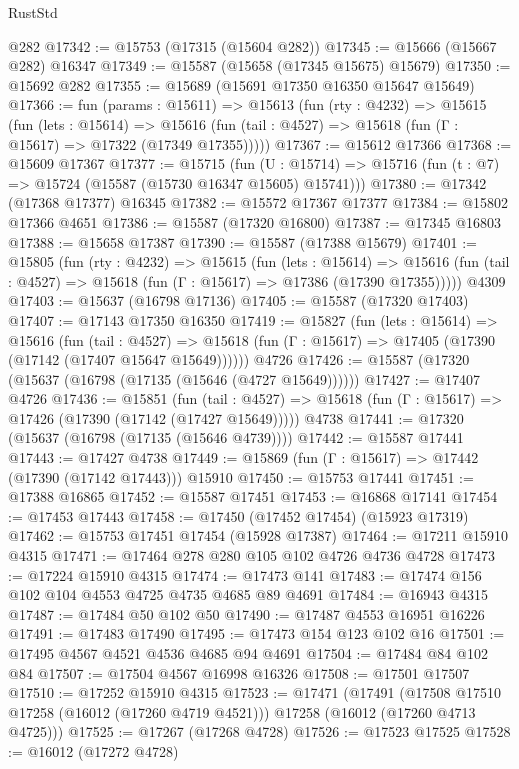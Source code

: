 \begin{lexlean}{RustStd}
\begin{coremodule}
    @282
@17342 := @15753 (@17315 (@15604 @282))
@17345 := @15666 (@15667 @282) @16347
@17349 := @15587 (@15658 (@17345 @15675) @15679)
@17350 := @15692 @282
@17355 := @15689 (@15691 @17350 @16350 @15647 @15649)
@17366 := fun (params : @15611) =>
  @15613
    (fun (rty : @4232) =>
    @15615
      (fun (lets : @15614) =>
      @15616 (fun (tail : @4527) => @15618 (fun (Γ : @15617) => @17322 (@17349 @17355)))))
@17367 := @15612 @17366
@17368 := @15609 @17367
@17377 := @15715
    (fun (U : @15714) => @15716 (fun (t : @7) => @15724 (@15587 (@15730 @16347 @15605) @15741)))
@17380 := @17342 (@17368 @17377) @16345
@17382 := @15572 @17367 @17377
@17384 := @15802 @17366 @4651
@17386 := @15587 (@17320 @16800)
@17387 := @17345 @16803
@17388 := @15658 @17387
@17390 := @15587 (@17388 @15679)
@17401 := @15805
    (fun (rty : @4232) =>
    @15615
      (fun (lets : @15614) =>
      @15616 (fun (tail : @4527) => @15618 (fun (Γ : @15617) => @17386 (@17390 @17355)))))
    @4309
@17403 := @15637 (@16798 @17136)
@17405 := @15587 (@17320 @17403)
@17407 := @17143 @17350 @16350
@17419 := @15827
    (fun (lets : @15614) =>
    @15616
      (fun (tail : @4527) =>
      @15618 (fun (Γ : @15617) => @17405 (@17390 (@17142 (@17407 @15647 @15649))))))
    @4726
@17426 := @15587 (@17320 (@15637 (@16798 (@17135 (@15646 (@4727 @15649))))))
@17427 := @17407 @4726
@17436 := @15851
    (fun (tail : @4527) => @15618 (fun (Γ : @15617) => @17426 (@17390 (@17142 (@17427 @15649)))))
    @4738
@17441 := @17320 (@15637 (@16798 (@17135 (@15646 @4739))))
@17442 := @15587 @17441
@17443 := @17427 @4738
@17449 := @15869 (fun (Γ : @15617) => @17442 (@17390 (@17142 @17443))) @15910
@17450 := @15753 @17441
@17451 := @17388 @16865
@17452 := @15587 @17451
@17453 := @16868 @17141
@17454 := @17453 @17443
@17458 := @17450 (@17452 @17454) (@15923 @17319)
@17462 := @15753 @17451 @17454 (@15928 @17387)
@17464 := @17211 @15910 @4315
@17471 := @17464 @278 @280 @105 @102 @4726 @4736 @4728
@17473 := @17224 @15910 @4315
@17474 := @17473 @141
@17483 := @17474 @156 @102 @104 @4553 @4725 @4735 @4685 @89 @4691
@17484 := @16943 @4315
@17487 := @17484 @50 @102 @50
@17490 := @17487 @4553 @16951 @16226
@17491 := @17483 @17490
@17495 := @17473 @154 @123 @102 @16
@17501 := @17495 @4567 @4521 @4536 @4685 @94 @4691
@17504 := @17484 @84 @102 @84
@17507 := @17504 @4567 @16998 @16326
@17508 := @17501 @17507
@17510 := @17252 @15910 @4315
@17523 := @17471
    (@17491
      (@17508 @17510 @17258 (@16012 (@17260 @4719 @4521)))
      @17258
      (@16012 (@17260 @4713 @4725)))
@17525 := @17267 (@17268 @4728)
@17526 := @17523 @17525
@17528 := @16012 (@17272 @4728)

\end{coremodule}
\end{lexlean}

